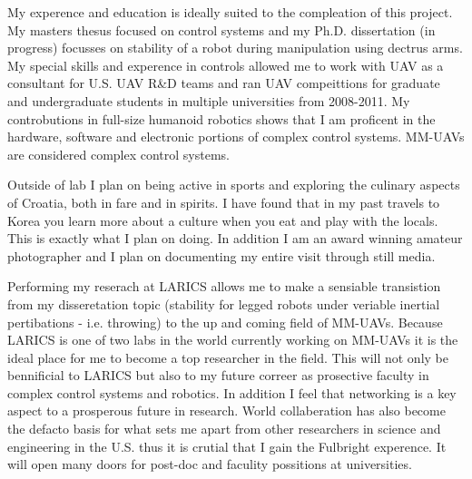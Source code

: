 \documentclass[12pt]{article}
\begin{document}
My experence and education is ideally suited to the compleation of this project.  My masters thesus focused on control systems and my Ph.D. dissertation (in progress) focusses on stability of a robot during manipulation using dectrus arms.  My special skills and experence in controls allowed me to work with UAV as a consultant for U.S. UAV R\&D teams and ran UAV compeittions for graduate and undergraduate students in multiple universities from 2008-2011.  My controbutions in full-size humanoid robotics shows that I am proficent in the hardware, software and electronic portions of complex control systems.  MM-UAVs are considered complex control systems.



Outside of lab I plan on being active in sports and exploring the culinary aspects of Croatia, both in fare and in spirits.  
I have found that in my past travels to Korea you learn more about a culture when you eat and play with the locals.  
This is exactly what I plan on doing.  
In addition I am an award winning amateur photographer and I plan on documenting my entire visit through still media.

Performing my reserach at LARICS allows me to make a sensiable transistion from my disseretation topic (stability for legged robots under veriable inertial pertibations - i.e. throwing) to the up and coming field of MM-UAVs.  
Because LARICS is one of two labs in the world currently working on MM-UAVs it is the ideal place for me to become  a top researcher in the field.  
This will not only be bennificial to LARICS but also to my future correer as prosective faculty in complex control systems and robotics.
In addition I feel that networking is a key aspect to a prosperous future in research.
World collaberation has also become the defacto basis for what sets me apart from other researchers in science and engineering in the U.S. thus it is crutial that I gain the Fulbright experence.
It will open many doors for post-doc and faculity possitions at universities.
\end{document}
